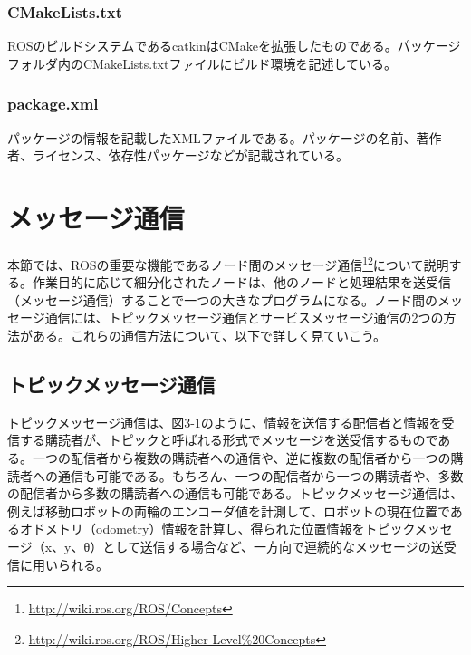 \subsubsection{CMakeLists.txt}
ROSのビルドシステムであるcatkinはCMakeを拡張したものである。パッケージフォルダ内のCMakeLists.txtファイルにビルド環境を記述している。

\subsubsection{package.xml}
パッケージの情報を記載したXMLファイルである。パッケージの名前、著作者、ライセンス、依存性パッケージなどが記載されている。

\section{メッセージ通信}

本節では、ROSの重要な機能であるノード間のメッセージ通信\footnote{\url{http://wiki.ros.org/ROS/Concepts}}\footnote{\url{http://wiki.ros.org/ROS/Higher-Level\%20Concepts}}について説明する。作業目的に応じて細分化されたノードは、他のノードと処理結果を送受信（メッセージ通信）することで一つの大きなプログラムになる。ノード間のメッセージ通信には、トピックメッセージ通信とサービスメッセージ通信の2つの方法がある。これらの通信方法について、以下で詳しく見ていこう。

\subsection{トピックメッセージ通信}
トピックメッセージ通信は、図3-1のように、情報を送信する配信者と情報を受信する購読者が、トピックと呼ばれる形式でメッセージを送受信するものである。一つの配信者から複数の購読者への通信や、逆に複数の配信者から一つの購読者への通信も可能である。もちろん、一つの配信者から一つの購読者や、多数の配信者から多数の購読者への通信も可能である。トピックメッセージ通信は、例えば移動ロボットの両輪のエンコーダ値を計測して、ロボットの現在位置であるオドメトリ（odometry）情報を計算し、得られた位置情報をトピックメッセージ（x、y、θ）として送信する場合など、一方向で連続的なメッセージの送受信に用いられる。

